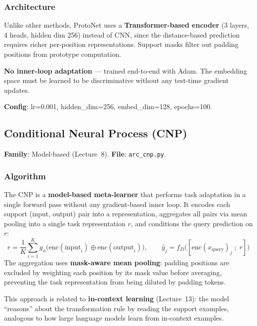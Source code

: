 \documentclass[11pt,a4paper]{article}
\begin{document}
\subsubsection{Architecture}
Unlike other methods, ProtoNet uses a \textbf{Transformer-based encoder} (3 layers, 4 heads, hidden dim 256) instead of CNN, since the distance-based prediction requires richer per-position representations. Support masks filter out padding positions from prototype computation.

\textbf{No inner-loop adaptation} --- trained end-to-end with Adam. The embedding space must be learned to be discriminative without any test-time gradient updates.

\textbf{Config}: lr=0.001, hidden\_dim=256, embed\_dim=128, epochs=100.

\subsection{Conditional Neural Process (CNP)~\cite{garnelo2018}}
\textbf{Family}: Model-based (Lecture~8). \textbf{File}: \texttt{arc\_cnp.py}.

\subsubsection{Algorithm}
The CNP is a \textbf{model-based meta-learner} that performs task adaptation in a single forward pass without any gradient-based inner loop. It encodes each support (input, output) pair into a representation, aggregates all pairs via mean pooling into a single task representation $r$, and conditions the query prediction on $r$:
\begin{equation}
  r = \frac{1}{K}\sum_{i=1}^{K} g_\phi\bigl(\text{enc}(\text{input}_i) \oplus \text{enc}(\text{output}_i)\bigr), \qquad \hat{y}_j = f_D\bigl([\text{enc}(x_{\text{query}})_j \;;\; r]\bigr)
\end{equation}
The aggregation uses \textbf{mask-aware mean pooling}: padding positions are excluded by weighting each position by its mask value before averaging, preventing the task representation from being diluted by padding tokens.

This approach is related to \textbf{in-context learning} (Lecture~13): the model ``reasons'' about the transformation rule by reading the support examples, analogous to how large language models learn from in-context examples.
\end{document}
